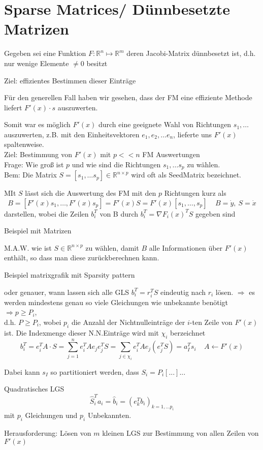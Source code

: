 \section{Sparse Matrices/ Dünnbesetzte Matrizen}
\label{chap:sparsemats}


Gegeben sei eine Funktion $F:\mathbb{R}^n\mapsto\mathbb{R}^m$ deren Jacobi-Matrix dünnbesetzt ist, d.h. nur wenige Elemente $\neq 0 $ besitzt


Ziel: effizientes Bestimmen dieser Einträge

Für den generellen Fall haben wir gesehen, dass der FM eine effiziente Methode liefert $F'(x)\cdot s$ auszuwerten.

Somit war es möglich $F'(x)$ durch eine geeignete Wahl von Richtungen  $s_1,\dots$ auszuwerten, z.B. mit den Einheitsvektoren $e_1,e_2, \dots e_n$, lieferte uns $F'(x)$ spaltenweise.\\



\noindent
Ziel: Bestimmung von $F'(x)$ mit $p <<n$ FM Auswertungen\\
Frage: Wie groß ist $p$ und wie sind die Richtungen $s_1,\dots s_p$ zu wählen.\\
Bem: Die Matrix $S = [s_1, \dots s_p] \in \mathbb{R}^{n\times p}$ wird oft als \glqq Seed\grqq Matrix bezeichnet.

MIt $S$ lässt sich die Auswertung des FM mit den $p$ Richtungen kurz als 
$$B = [ F'(x)s_1 , \dots , F'(x)s_p] = F'(x) S = F'(x) [s_1,\dots,s_p]\ \ \ \ \  B= \dot{y},\ S=\dot{x}$$
darstellen, wobei die Zeilen $b_i^T$ von B durch $b_i^T = \nabla F_i(x)^TS$ gegeben sind

Beispiel mit Matrizen

M.A.W. wie ist $S\in\mathbb{R}^{n\times p}$ zu wählen, damit $B$ alle Informationen über $F'(x)$ enthält, so dass man diese zurückberechnen kann.

Beispiel matrixgrafik mit Sparsity pattern

oder genauer, wann lassen sich alle GLS $b_i^T = r_i^TS$ eindeutig nach $r_i$ lösen.
$\Rightarrow$ es werden mindestens genau so viele Gleichungen wie unbekannte benötigt\\
$\Rightarrow p \ge P_i$,\\

d.h. $P \geq P_i$, wobei $p_i$ die Anzahl der Nichtnulleinträge der $i$-ten Zeile von $F'(x)$ ist. Die Indexmenge dieser N.N.Einträge wird mit $\chi_i$ berzeichnet
$$b_i^T = e_i^T A \cdot S = \sum_{j=1}^n e_i^T A e_j e_j^T S =\sum_{j\in \chi_i} e_i^T A e_j (e_j^T S) = a_I^T s_i \ \ \ \ \ A \leftarrow F'(x)$$

Dabei kann $s_I$ so partitioniert werden, dass $S_i = P_i [...]...$

Quadratisches LGS
$$\hat{S}_i^Ta_i = \hat{b}_i = (e_k^Tb_i)_{k=1,\dots p_i}$$
mit $p_i$ Gleichungen und $p_i$ Unbekannten.

Herausforderung: Lösen von $m$ kleinen LGS zur Bestimmung von allen Zeilen von $F'(x)$\\


